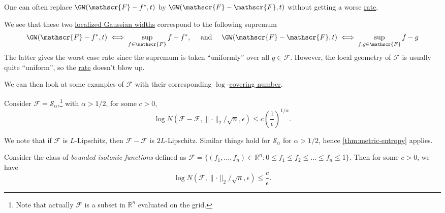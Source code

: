 \begin{remark}
	One can often replace \(\GW(\mathscr{F} - f^{\ast} , t) \) by \(\GW(\mathscr{F} - \mathscr{F} , t) \) without getting a worse \hyperref[def:rate-of-convergence]{rate}.
\end{remark}
\begin{explanation}
	We see that these two \hyperref[def:localized-Gaussian-width]{localized Gaussian widths} correspond to the following supremum
	\[
		\GW(\mathscr{F} - f^{\ast} , t)   \iff \sup _{f\in \mathscr{F} } f - f^{\ast}, \quad \text{ and } \quad
		\GW(\mathscr{F} - \mathscr{F} , t) \iff \sup _{f, g \in \mathscr{F} } f - g
	\]
	The latter gives the worst case rate since the supremum is taken ``uniformly'' over all \(g\in \mathscr{F} \). However, the local geometry of \(\mathscr{F} \) is usually quite ``uniform'', so the \hyperref[def:rate-of-convergence]{rate} doesn't blow up.
\end{explanation}

We can then look at some examples of \(\mathscr{F} \) with their corresponding \(\log \)-\hyperref[def:covering-number]{covering number}.

\begin{eg}
	Consider \(\mathscr{F} = \mathcal{S} _\alpha \),\footnote{Note that actually \(\mathscr{F} \) is a subset in \(\mathbb{R} ^n\) evaluated on the grid.} with \(\alpha > 1 / 2\), for some \(c > 0\),
	\[
		\log N(\mathscr{F} - \mathscr{F} , \lVert \cdot \rVert _2 / \sqrt{n} , \epsilon ) \leq c \left( \frac{1}{\epsilon } \right) ^{1 / \alpha }.
	\]
\end{eg}
\begin{explanation}
	We note that if \(\mathscr{F} \) is \(L\)-Lipschitz, then \(\mathscr{F} - \mathscr{F} \) is \(2L\)-Lipschitz. Similar things hold for \(\mathcal{S} _\alpha \) for \(\alpha > 1 / 2\), hence \autoref{thm:metric-entropy} applies.
\end{explanation}

\begin{eg}
	Consider the class of \emph{bounded isotonic functions} defined as \(\mathscr{F} = \{(f_1, \dots , f_n) \in \mathbb{R} ^n \colon 0 \leq f_1 \leq f_2 \leq \dots \leq f_n \leq 1 \}\). Then for some \(c > 0\), we have
	\[
		\log N(\mathscr{F} , \lVert \cdot \rVert _2 / \sqrt{n} , \epsilon ) \leq \frac{c}{\epsilon }.
	\]
\end{eg}

